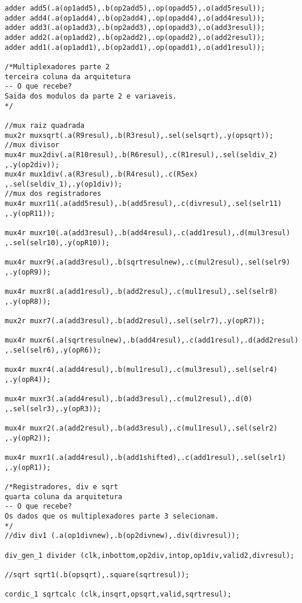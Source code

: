 \begin{lstlisting}[style={verilog-style}]
adder add5(.a(op1add5),.b(op2add5),.op(opadd5),.o(add5resul));
adder add4(.a(op1add4),.b(op2add4),.op(opadd4),.o(add4resul));
adder add3(.a(op1add3),.b(op2add3),.op(opadd3),.o(add3resul));
adder add2(.a(op1add2),.b(op2add2),.op(opadd2),.o(add2resul));
adder add1(.a(op1add1),.b(op2add1),.op(opadd1),.o(add1resul));

/*Multiplexadores parte 2 
terceira coluna da arquitetura
-- O que recebe?
Saida dos modulos da parte 2 e variaveis.
*/

//mux raiz quadrada
mux2r muxsqrt(.a(R9resul),.b(R3resul),.sel(selsqrt),.y(opsqrt));
//mux divisor
mux4r mux2div(.a(R10resul),.b(R6resul),.c(R1resul),.sel(seldiv_2)
,.y(op2div));
mux4r mux1div(.a(R3resul),.b(R4resul),.c(R5ex)
,.sel(seldiv_1),.y(op1div));
//mux dos registradores
mux4r muxr11(.a(add5resul),.b(add5resul),.c(divresul),.sel(selr11)
,.y(opR11));

mux4r muxr10(.a(add3resul),.b(add4resul),.c(add1resul),.d(mul3resul)
,.sel(selr10),.y(opR10));

mux4r muxr9(.a(add3resul),.b(sqrtresulnew),.c(mul2resul),.sel(selr9)
,.y(opR9));

mux4r muxr8(.a(add1resul),.b(add2resul),.c(mul1resul),.sel(selr8)
,.y(opR8));

mux2r muxr7(.a(add3resul),.b(add2resul),.sel(selr7),.y(opR7));

mux4r muxr6(.a(sqrtresulnew),.b(add4resul),.c(add1resul),.d(add2resul)
,.sel(selr6),.y(opR6));

mux4r muxr4(.a(add4resul),.b(mul1resul),.c(mul3resul),.sel(selr4)
,.y(opR4));

mux4r muxr3(.a(add4resul),.b(add3resul),.c(mul2resul),.d(0)
,.sel(selr3),.y(opR3));

mux4r muxr2(.a(add2resul),.b(add3resul),.c(mul1resul),.sel(selr2)
,.y(opR2));

mux4r muxr1(.a(add4resul),.b(add1shifted),.c(add1resul),.sel(selr1)
,.y(opR1));

/*Registradores, div e sqrt
quarta coluna da arquitetura
-- O que recebe?
Os dados que os multiplexadores parte 3 selecionam.
*/  
//div div1 (.a(op1divnew),.b(op2divnew),.div(divresul));

div_gen_1 divider (clk,inbottom,op2div,intop,op1div,valid2,divresul);

//sqrt sqrt1(.b(opsqrt),.square(sqrtresul));

cordic_1 sqrtcalc (clk,insqrt,opsqrt,valid,sqrtresul);



\end{lstlisting}

